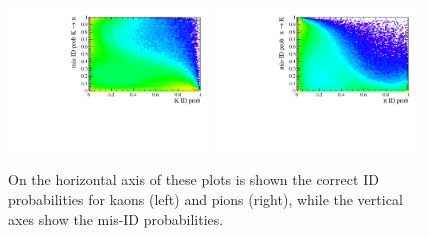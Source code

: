%
\begin{figure}[h!]
\centering 
\includegraphics[width=0.48\textwidth]{RKst/figs/kaon_PID.pdf}
\includegraphics[width=0.48\textwidth]{RKst/figs/pion_PID.pdf}
\caption{On the horizontal axis of these plots is shown the correct ID
probabilities for kaons (left) and pions (right),
 while the vertical axes show the mis-ID probabilities.}
\label{fig:k_pi_pid}
\end{figure}


